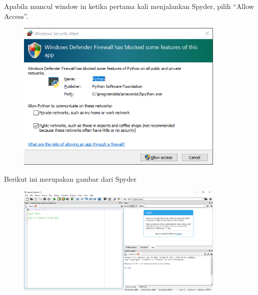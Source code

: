 Apabila muncul window in ketika pertama kali menjalankan Spyder, pilih “Allow Access”.
\begin{figure}[H]
	\includegraphics[width=10cm]{figures/diva/17chp1diva.png}
	\centering
\end{figure}
		
Berikut ini merupakan gambar dari Spyder
\begin{figure}[H]
	\includegraphics[width=10cm]{figures/diva/18chp1diva.png}
	\centering
\end{figure}

